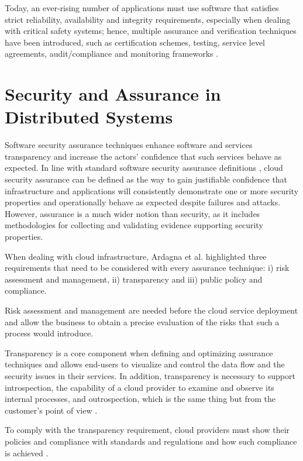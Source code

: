 Today, an ever-rising number of applications must use software that satisfies strict reliability, availability and integrity requirements, especially when dealing with critical safety systems; hence, multiple assurance and verification techniques have been introduced, such as certification schemes, testing, service level agreements, audit/compliance and monitoring frameworks \cite{ardagna2015security}. 


\section{Security and Assurance in Distributed Systems}
Software security assurance techniques enhance software and services transparency \cite{ardagna2014management} and increase the actors' confidence that such services behave as expected. In line with standard software security assurance definitions \cite{goertzel2007software}, cloud security assurance can be defined as the way to gain justifiable confidence that infrastructure and applications will consistently demonstrate one or more security properties and operationally behave as expected despite failures and attacks. However, assurance is a much wider notion than security, as it includes methodologies for collecting and validating evidence supporting security properties.

When dealing with cloud infrastructure, Ardagna et al. \cite{article} highlighted three requirements that need to be considered with every assurance technique: i) risk assessment and management, ii) transparency and iii) public policy and compliance.

Risk assessment and management are needed before the cloud service deployment and allow the business to obtain a precise evaluation of the risks that such a process would introduce.

Transparency is a core component when defining and optimizing assurance techniques and allows end-users to visualize and control the data flow and the security issues in their services. In addition, transparency is necessary to support introspection, the capability of a cloud provider to examine and observe its internal processes, and outrospection, which is the same thing but from the customer's point of view \cite{ardagna2014management}.

To comply with the transparency requirement, cloud providers must show their policies and compliance with standards and regulations and how such compliance is achieved \cite{macneil2006comply}.

